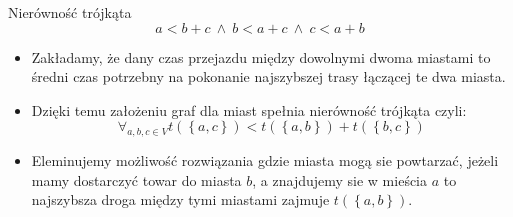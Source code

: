 \begin{block}{Nierówność trójkąta}
	\begin{equation}
		a < b + c \ \wedge \ b < a + c \ \wedge \ c < a + b
	\end{equation}
	\begin{itemize}
		\item Zakładamy, że dany czas przejazdu między dowolnymi dwoma miastami to średni czas potrzebny na pokonanie najszybszej trasy łączącej te dwa miasta.
		\item Dzięki temu założeniu graf dla miast spełnia nierówność trójkąta czyli:
			\begin{equation}
				\forall_{a,b,c \in V} t(\left\{a, c\right\}) < t(\left\{a, b\right\}) + t(\left\{b, c\right\})
			\end{equation}
		\item Eleminujemy możliwość rozwiązania gdzie miasta mogą sie powtarzać, jeżeli mamy dostarczyć towar do miasta $b$, a znajdujemy sie w mieścia $a$ to najszybsza droga między tymi miastami zajmuje $t(\left\{a, b\right\})$.
	\end{itemize}

	
\end{block}
